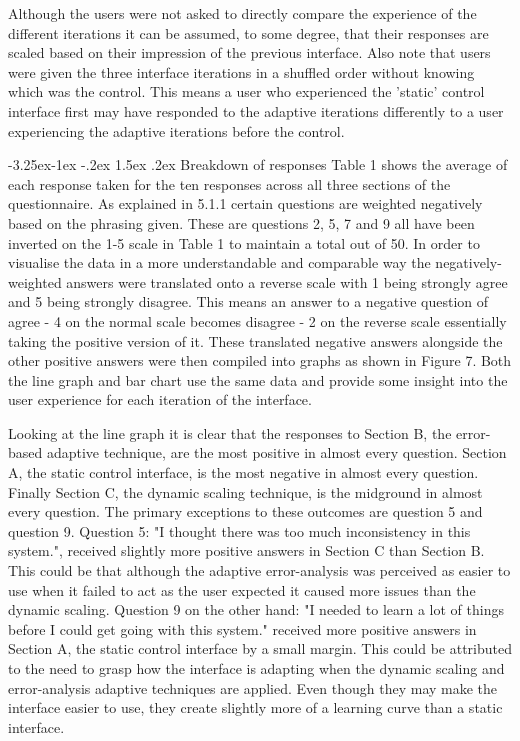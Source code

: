 \documentclass[12pt]{article}
\makeatletter
\renewcommand{\subsubsection}{\@startsection{subsubsection}{2}{\z@}%
             {-3.25ex\@plus -1ex \@minus -.2ex}%
             {1.5ex \@plus .2ex}%
             {\normalfont\normalsize\scshape\bfseries}}
\makeatother
\begin{document}
Although the users were not asked to directly compare the experience of the different iterations it can be assumed, to some degree, that their responses are scaled based on their impression of the previous interface. Also note that users were given the three interface iterations in a shuffled order without knowing which was the control. This means a user who experienced the 'static' control interface first may have responded to the adaptive iterations differently to a user experiencing the adaptive iterations before the control.

\subsubsection{Breakdown of responses}
Table 1 shows the average of each response taken for the ten responses across all three sections of the questionnaire. As explained in 5.1.1 certain questions are weighted negatively based on the phrasing given. These are questions 2, 5, 7 and 9 all have been inverted on the 1-5 scale in Table 1 to maintain a total out of 50. In order to visualise the data in a more understandable and comparable way the negatively-weighted answers were translated onto a reverse scale with 1 being strongly agree and 5 being strongly disagree. This means an answer to a negative question of agree - 4 on the normal scale becomes disagree - 2 on the reverse scale essentially taking the positive version of it. These translated negative answers alongside the other positive answers were then compiled into graphs as shown in Figure 7. Both the line graph and bar chart use the same data and provide some insight into the user experience for each iteration of the interface.

Looking at the line graph it is clear that the responses to Section B, the error-based adaptive technique, are the most positive in almost every question. Section A, the static control interface, is the most negative in almost every question. Finally Section C, the dynamic scaling technique, is the midground in almost every question. The primary exceptions to these outcomes are question 5 and  question 9. Question 5: "I thought there was too much inconsistency in this system.", received slightly more positive answers in Section C than Section B. This could be that although the adaptive error-analysis was perceived as easier to use when it failed to act as the user expected it caused more issues than the dynamic scaling. Question 9 on the other hand: "I needed to learn a lot of things before I could get going with this system." received more positive answers in Section A, the static control interface by a small margin. This could be attributed to the need to grasp how the interface is adapting when the dynamic scaling and error-analysis adaptive techniques are applied. Even though they may make the interface easier to use, they create slightly more of a learning curve than a static interface.
\end{document}
